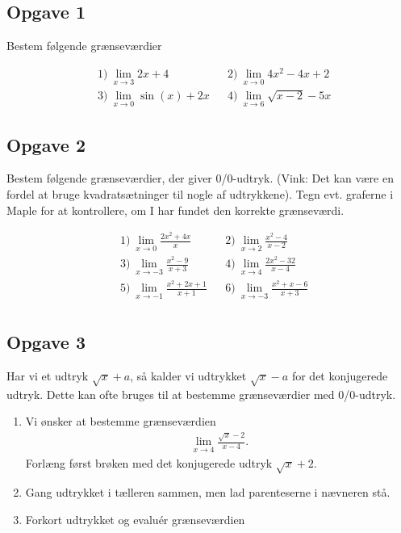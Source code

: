\subsection*{Opgave 1}
Bestem følgende grænseværdier

\begin{align*}
	&1) \ \lim_{x \to 3} 2x + 4 &  &2) \ \lim_{x \to 0} 4x^2 -4x + 2 \\
	&3) \ \lim_{x \to 0} \sin(x) + 2x &  &4) \ \lim_{x \to 6} \sqrt{x - 2} - 5x
\end{align*}

\subsection*{Opgave 2}
Bestem følgende grænseværdier, der giver 0/0-udtryk. (Vink: Det kan være en fordel at bruge kvadratsætninger til nogle af udtrykkene). Tegn evt. graferne i Maple for at kontrollere, om I har fundet den korrekte grænseværdi.

\begin{align*}
	&1) \ \lim_{x \to 0} \frac{2x^2+4x}{x} & &2) \ \lim_{x \to 2} \frac{x^2 - 4}{x - 2} \\
	&3) \ \lim_{x \to -3} \frac{x^2 - 9}{x+3} & &4) \ \lim_{x \to 4} \frac{2x^2 - 32}{x - 4} \\
	&5) \ \lim_{x \to -1} \frac{x^2 + 2x + 1}{x+1} & &6) \ \lim_{x \to -3} \frac{x^2+x-6}{x+3} \\
\end{align*}

\subsection*{Opgave 3}
Har vi et udtryk $\sqrt{x} + a$, så kalder vi udtrykket $\sqrt{x} - a$ for det konjugerede udtryk. Dette kan ofte bruges til at bestemme grænseværdier med 0/0-udtryk. 
\begin{enumerate}[label=\roman*)]
	\item Vi ønsker at bestemme grænseværdien
	\begin{align*}
		\lim_{x \to 4} \frac{\sqrt{x}-2}{x-4}.
	\end{align*}
	Forlæng først brøken med det konjugerede udtryk $\sqrt{x}+2$. 
	\item Gang udtrykket i tælleren sammen, men lad parenteserne i nævneren stå.
	\item Forkort udtrykket og evaluér grænseværdien
\end{enumerate}

